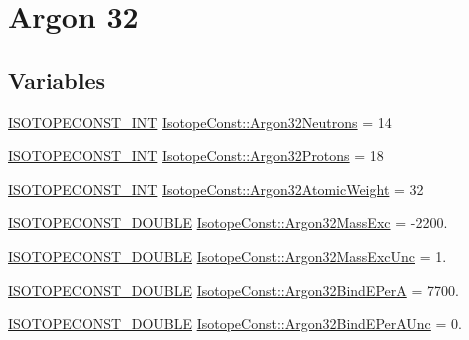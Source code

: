 \hypertarget{group___isotope_const-_argon-_ar32}{}\section{Argon 32}
\label{group___isotope_const-_argon-_ar32}
\subsection*{Variables}
\begin{DoxyCompactItemize}
\item 
\mbox{\hyperlink{group___isotope_const-_macros_ga5f18360b3e99483a35c32d789e62621c}{I\+S\+O\+T\+O\+P\+E\+C\+O\+N\+S\+T\+\_\+\+I\+NT}} \mbox{\hyperlink{group___isotope_const-_argon-_ar32_gafa96fbc3376e61b77faf910d98d8d98a}{Isotope\+Const\+::\+Argon32\+Neutrons}} = 14
\item 
\mbox{\hyperlink{group___isotope_const-_macros_ga5f18360b3e99483a35c32d789e62621c}{I\+S\+O\+T\+O\+P\+E\+C\+O\+N\+S\+T\+\_\+\+I\+NT}} \mbox{\hyperlink{group___isotope_const-_argon-_ar32_ga5b11e5fa7c393dd7464ace1b8999de84}{Isotope\+Const\+::\+Argon32\+Protons}} = 18
\item 
\mbox{\hyperlink{group___isotope_const-_macros_ga5f18360b3e99483a35c32d789e62621c}{I\+S\+O\+T\+O\+P\+E\+C\+O\+N\+S\+T\+\_\+\+I\+NT}} \mbox{\hyperlink{group___isotope_const-_argon-_ar32_ga17bbd71436a63e096d003bd7ede44cf5}{Isotope\+Const\+::\+Argon32\+Atomic\+Weight}} = 32
\item 
\mbox{\hyperlink{group___isotope_const-_macros_ga8f45a7272ce02c0b4c65c44636ed719a}{I\+S\+O\+T\+O\+P\+E\+C\+O\+N\+S\+T\+\_\+\+D\+O\+U\+B\+LE}} \mbox{\hyperlink{group___isotope_const-_argon-_ar32_gad45fc14b589f9925a755d1627fb389dc}{Isotope\+Const\+::\+Argon32\+Mass\+Exc}} = -\/2200.
\item 
\mbox{\hyperlink{group___isotope_const-_macros_ga8f45a7272ce02c0b4c65c44636ed719a}{I\+S\+O\+T\+O\+P\+E\+C\+O\+N\+S\+T\+\_\+\+D\+O\+U\+B\+LE}} \mbox{\hyperlink{group___isotope_const-_argon-_ar32_ga0cd9b3e0e8aa71925608b137dc77a063}{Isotope\+Const\+::\+Argon32\+Mass\+Exc\+Unc}} = 1.
\item 
\mbox{\hyperlink{group___isotope_const-_macros_ga8f45a7272ce02c0b4c65c44636ed719a}{I\+S\+O\+T\+O\+P\+E\+C\+O\+N\+S\+T\+\_\+\+D\+O\+U\+B\+LE}} \mbox{\hyperlink{group___isotope_const-_argon-_ar32_gac4a45237f41f0ad503bab132ea27b4c3}{Isotope\+Const\+::\+Argon32\+Bind\+E\+PerA}} = 7700.
\item 
\mbox{\hyperlink{group___isotope_const-_macros_ga8f45a7272ce02c0b4c65c44636ed719a}{I\+S\+O\+T\+O\+P\+E\+C\+O\+N\+S\+T\+\_\+\+D\+O\+U\+B\+LE}} \mbox{\hyperlink{group___isotope_const-_argon-_ar32_ga1d7b38ea798194635ee65fc7a41dc59e}{Isotope\+Const\+::\+Argon32\+Bind\+E\+Per\+A\+Unc}} = 0.

\end{DoxyCompactItemize}
